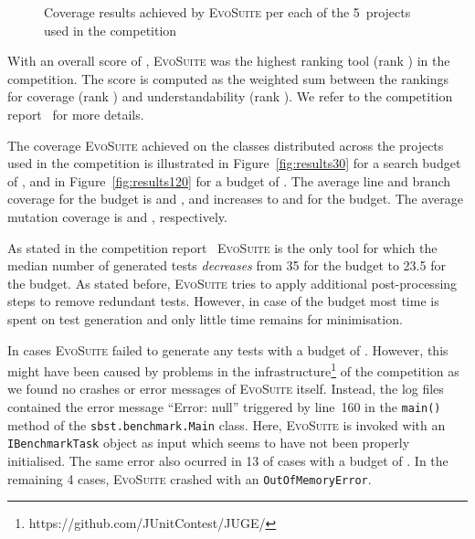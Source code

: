 \documentclass[10pt,conference]{IEEEtran}
\newcommand{\project}[1]{\textsc{#1}\xspace}
\newcommand{\Threeten}{\project{Threeten}}
\newcommand{\EVOSUITE}{\textsc{EvoSuite}\xspace}
\begin{document}
\begin{figure}
  \caption{Coverage results achieved by \EVOSUITE per each of the 5~projects
    used in the competition}
  \label{fig:figures}
\end{figure}


With an overall score of \score, \EVOSUITE was the highest ranking tool
(rank \rank) in the competition. The score is computed as the weighted
sum between the rankings for coverage (rank \rankCoverage) and understandability
(rank \rankUnderstandability). We refer to the competition report~\cite{SBFT-toolcomp23}
for more details.

The coverage \EVOSUITE achieved on the \cuts classes distributed across the \projects
projects used in the competition is illustrated in Figure~\ref{fig:results30} for a search
budget of \budgetShort, and in Figure~\ref{fig:results120} for a budget of \budgetLong.
The average line and branch coverage for the \budgetShort budget is
\avgLinesCoverageRatioShort and \avgConditionsCoverageRatioShort, and
increases to \avgLinesCoverageRatioLong and \avgConditionsCoverageRatioLong
for the \budgetLong budget. The average mutation coverage is \avgMutantsCoverageRatioShort
and \avgMutantsCoverageRatioLong, respectively.

As stated in the competition report~\cite{SBFT-toolcomp23} \EVOSUITE is the
only tool for which the median number of generated tests \emph{decreases}
from \num{35} for the \budgetShort budget to \num{23.5} for the \budgetLong budget.
As stated before, \EVOSUITE tries to apply additional post-processing steps to remove
redundant tests. However, in case of the \budgetShort budget most time is spent on test
generation and only little time remains for minimisation.


In \numTestGenFailedShort cases \EVOSUITE failed to generate any tests with a
budget of \budgetShort. However, this might have been caused by problems in the
infrastructure\footnote{https://github.com/JUnitContest/JUGE/}
of the competition as we found no crashes or error messages
of \EVOSUITE itself. Instead, the log files contained the error message
``Error: null'' triggered by line~160 in the \texttt{main()} method of
the \texttt{sbst.benchmark.Main} class. Here, \EVOSUITE is invoked with an
\texttt{IBenchmarkTask} object as input which seems to have not been properly
initialised.
%
The same error also ocurred in 13 of \numTestGenFailedLong
cases with a budget of \budgetLong. In the remaining 4 cases, \EVOSUITE crashed
with an \texttt{OutOfMemoryError}. %
\end{document}
